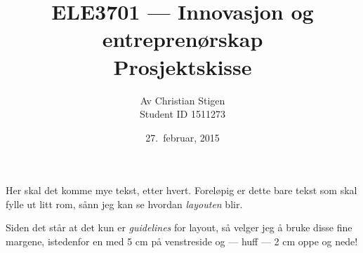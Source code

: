 \documentclass[a4paper,norsk,12pt]{report}
\begin{document}
  \author{Av Christian Stigen\\Student ID 1511273}
  \date{27.~februar, 2015}
  \title{ELE3701 --- Innovasjon og entreprenørskap\\Prosjektskisse}







  \maketitle

  Her skal det komme mye tekst, etter hvert.  Foreløpig er dette bare tekst som
  skal fylle ut litt rom, sånn jeg kan se hvordan \textit{layouten} blir.

  Siden det står at det kun er \textit{guidelines} for layout, så velger jeg å
  bruke disse fine margene, istedenfor en med 5 cm på venstreside og ---
  huff --- 2 cm oppe og nede!
\end{document}
